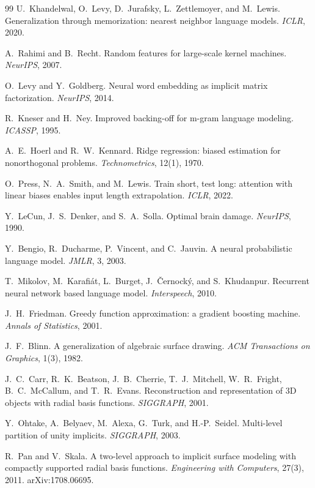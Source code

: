 \documentclass[11pt]{article}
\begin{document}
\begin{thebibliography}{99}
U.~Khandelwal, O.~Levy, D.~Jurafsky, L.~Zettlemoyer, and M.~Lewis.
Generalization through memorization: nearest neighbor language
models.
\emph{ICLR}, 2020.

A.~Rahimi and B.~Recht.
Random features for large-scale kernel machines.
\emph{NeurIPS}, 2007.

O.~Levy and Y.~Goldberg.
Neural word embedding as implicit matrix factorization.
\emph{NeurIPS}, 2014.

R.~Kneser and H.~Ney.
Improved backing-off for m-gram language modeling.
\emph{ICASSP}, 1995.

A.~E.~Hoerl and R.~W.~Kennard.
Ridge regression: biased estimation for nonorthogonal problems.
\emph{Technometrics}, 12(1), 1970.

O.~Press, N.~A.~Smith, and M.~Lewis.
Train short, test long: attention with linear biases enables input
length extrapolation.
\emph{ICLR}, 2022.

Y.~LeCun, J.~S.~Denker, and S.~A.~Solla.
Optimal brain damage.
\emph{NeurIPS}, 1990.

Y.~Bengio, R.~Ducharme, P.~Vincent, and C.~Jauvin.
A neural probabilistic language model.
\emph{JMLR}, 3, 2003.

T.~Mikolov, M.~Karafi\'at, L.~Burget, J.~\v{C}ernock\'y, and
S.~Khudanpur.
Recurrent neural network based language model.
\emph{Interspeech}, 2010.

J.~H.~Friedman.
Greedy function approximation: a gradient boosting machine.
\emph{Annals of Statistics}, 2001.

J.~F.~Blinn.
A generalization of algebraic surface drawing.
\emph{ACM Transactions on Graphics}, 1(3), 1982.

J.~C.~Carr, R.~K.~Beatson, J.~B.~Cherrie, T.~J.~Mitchell,
W.~R.~Fright, B.~C.~McCallum, and T.~R.~Evans.
Reconstruction and representation of 3D objects with radial basis
functions.
\emph{SIGGRAPH}, 2001.

Y.~Ohtake, A.~Belyaev, M.~Alexa, G.~Turk, and H.-P.~Seidel.
Multi-level partition of unity implicits.
\emph{SIGGRAPH}, 2003.

R.~Pan and V.~Skala.
A two-level approach to implicit surface modeling with compactly
supported radial basis functions.
\emph{Engineering with Computers}, 27(3), 2011. arXiv:1708.06695.


\end{thebibliography}
\end{document}
